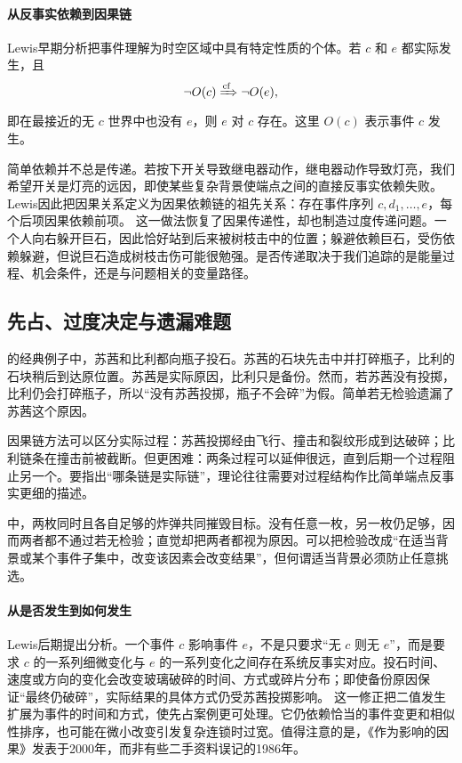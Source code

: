 \paragraph{从反事实依赖到因果链}

Lewis早期分析把事件理解为时空区域中具有特定性质的个体。若 $c$ 和 $e$ 都实际发生，且
\[
\neg O(c)\xRightarrow{\mathrm{cf}} \neg O(e),
\]
即在最接近的无 $c$ 世界中也没有 $e$，则 $e$ 对 $c$ 存在\parencite{lewisCausation1973}。这里 $O(c)$ 表示事件 $c$ 发生。

简单依赖并不总是传递。若按下开关导致继电器动作，继电器动作导致灯亮，我们希望开关是灯亮的远因，即使某些复杂背景使端点之间的直接反事实依赖失败。Lewis因此把因果关系定义为因果依赖链的祖先关系：存在事件序列 $c,d_1,\dots,e$，每个后项因果依赖前项。
这一做法恢复了因果传递性，却也制造过度传递问题。一个人向右躲开巨石，因此恰好站到后来被树枝击中的位置；躲避依赖巨石，受伤依赖躲避，但说巨石造成树枝击伤可能很勉强。是否传递取决于我们追踪的是能量过程、机会条件，还是与问题相关的变量路径。

\subsection{先占、过度决定与遗漏难题}

的经典例子中，苏茜和比利都向瓶子投石。苏茜的石块先击中并打碎瓶子，比利的石块稍后到达原位置。苏茜是实际原因，比利只是备份。然而，若苏茜没有投掷，比利仍会打碎瓶子，所以“没有苏茜投掷，瓶子不会碎”为假。简单若无检验遗漏了苏茜这个原因。

因果链方法可以区分实际过程：苏茜投掷经由飞行、撞击和裂纹形成到达破碎；比利链条在撞击前被截断。但更困难：两条过程可以延伸很远，直到后期一个过程阻止另一个。要指出“哪条链是实际链”，理论往往需要对过程结构作比简单端点反事实更细的描述。

中，两枚同时且各自足够的炸弹共同摧毁目标。没有任意一枚，另一枚仍足够，因而两者都不通过若无检验；直觉却把两者都视为原因。可以把检验改成“在适当背景或某个事件子集中，改变该因素会改变结果”，但何谓适当背景必须防止任意挑选。

\paragraph{从是否发生到如何发生}

Lewis后期提出分析。一个事件 $c$ 影响事件 $e$，不是只要求“无 $c$ 则无 $e$”，而是要求 $c$ 的一系列细微变化与 $e$ 的一系列变化之间存在系统反事实对应\parencite{lewisInfluence2000}。投石时间、速度或方向的变化会改变玻璃破碎的时间、方式或碎片分布；即使备份原因保证“最终仍破碎”，实际结果的具体方式仍受苏茜投掷影响。
这一修正把二值发生扩展为事件的时间和方式，使先占案例更可处理。它仍依赖恰当的事件变更和相似性排序，也可能在微小改变引发复杂连锁时过宽。值得注意的是，《作为影响的因果》发表于2000年，而非有些二手资料误记的1986年。

